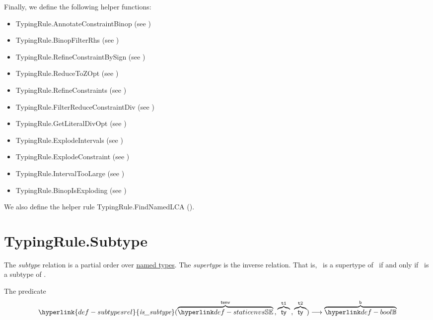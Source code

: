 \documentclass{book}
\newcommand\subtypesrel[0]{\hyperlink{def-subtypesrel}{\textfunc{is\_subtype}}}
\begin{document}
Finally, we define the following helper functions:
\begin{itemize}
  \item TypingRule.AnnotateConstraintBinop (see )
  \item TypingRule.BinopFilterRhs (see )
  \item TypingRule.RefineConstraintBySign (see )
  \item TypingRule.ReduceToZOpt (see )
  \item TypingRule.RefineConstraints (see )
  \item TypingRule.FilterReduceConstraintDiv (see )
  \item TypingRule.GetLiteralDivOpt (see )
  \item TypingRule.ExplodeIntervals (see )
  \item TypingRule.ExplodeConstraint (see )
  \item TypingRule.IntervalTooLarge (see )
  \item TypingRule.BinopIsExploding (see )
\end{itemize}

We also define the helper rule TypingRule.FindNamedLCA ().

\section{TypingRule.Subtype\label{sec:TypingRule.Subtype}}
The \emph{subtype} relation is a partial order over \underline{named types}.
The \emph{supertype} is the inverse relation. That is, \tty\ is a supertype of \tsy\ if and only if \tsy\ is a subtype of \tty.

\hypertarget{def-subtypesrel}{}
The predicate
\[
  \subtypesrel(\overname{\staticenvs}{\tenv} \aslsep \overname{\ty}{\vtone} \aslsep \overname{\ty}{\vttwo})
  \aslto \overname{\Bool}{\vb}
\]
\end{document}
